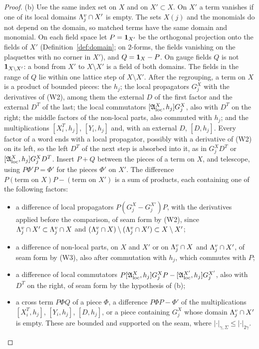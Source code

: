 \begin{proof}
(b) Use the same index set on $X$ and on $X'\subset X$. On $X'$ a term vanishes if one of its local domains $\Lambda^v_j\cap X'$ is empty. The sets $X(j)$ and the monomials do not depend on the domain, so matched terms have the same domain and monomial. On each field space let $P=\mathbf 1_{X'}$ be the orthogonal projection onto the fields of $X'$ (Definition~\ref{def:domain}; on $2$-forms, the fields vanishing on the plaquettes with no corner in $X'$), and $Q=\mathbf 1_X-P$. On gauge fields $Q$ is not $\mathbf 1_{X\setminus X'}$: a bond from $X'$ to $X\setminus X'$ is a field of both domains. The fields in the range of $Q$ lie within one lattice step of $X\setminus X'$. After the regrouping, a term on $X$ is a product of bounded pieces: the $h_j$; the local propagators $G^X_j$ with the derivatives of (W2), among them the external $D$ of the first factor and the external $D^T$ of the last; the local commutators $[\mathfrak A^X_{\rm loc},h_j]G^X_j$, also with $D^T$ on the right; the middle factors of the non-local parts, also commuted with $h_j$; and the multiplications $[X_i^T,h_j]$, $[Y_i,h_j]$ and, with an external $D$, $[D,h_j]$. Every factor of a word ends with a local propagator, possibly with a derivative of (W2) on its left, so the left $D^T$ of the next step is absorbed into it, as in $G^X_jD^T$ or $[\mathfrak A^X_{\rm loc},h_j]G^X_jD^T$. Insert $P+Q$ between the pieces of a term on $X$, and telescope, using $P\Phi'P=\Phi'$ for the pieces $\Phi'$ on $X'$. The difference $P(\text{term on }X)P-(\text{term on }X')$ is a sum of products, each containing one of the following factors:
\begin{itemize}
\item a difference of local propagators $P(G^X_j-G^{X'}_j)P$, with the derivatives applied before the comparison, of seam form by (W2), since $\Lambda^v_j\cap X'\subset\Lambda^v_j\cap X$ and $(\Lambda^v_j\cap X)\setminus(\Lambda^v_j\cap X')\subset X\setminus X'$;
\item a difference of non-local parts, on $X$ and $X'$ or on $\Lambda^v_j\cap X$ and $\Lambda^v_j\cap X'$, of seam form by (W3), also after commutation with $h_j$, which commutes with $P$;
\item a difference of local commutators $P[\mathfrak A^X_{\rm loc},h_j]G^X_jP-[\mathfrak A^{X'}_{\rm loc},h_j]G^{X'}_j$, also with $D^T$ on the right, of seam form by the hypothesis of (b);
\item a cross term $P\Phi Q$ of a piece $\Phi$, a difference $P\Phi P-\Phi'$ of the multiplications $[X_i^T,h_j]$, $[Y_i,h_j]$, $[D,h_j]$, or a piece containing $G^X_j$ whose domain $\Lambda^v_j\cap X'$ is empty. These are bounded and supported on the seam, where $|\cdot|_{\gamma,\Sigma}\le|\cdot|_{2\gamma}$.

\end{itemize}
\end{proof}

